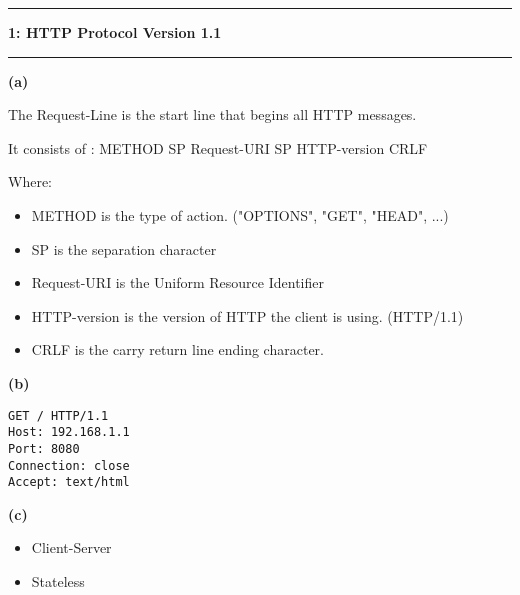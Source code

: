 \documentclass[11pt]{article}
\newcommand\question[2]{\vspace{.25in}\hrule\textbf{#1: #2}\vspace{.5em}\hrule\vspace{.10in}}
\renewcommand\part[1]{\vspace{.10in}\textbf{(#1)}}
\begin{document}
\raggedright

\newcommand\NAME{Lukas, Young, Vincent}  %

\question{1}{HTTP Protocol Version 1.1}

\part{a}

The Request-Line is the start line that begins all HTTP messages.

It consists of : METHOD SP Request-URI SP HTTP-version CRLF

Where:

\begin{itemize}

	\item METHOD is the type of action. ("OPTIONS", "GET", "HEAD", ...)

	\item SP is the separation character

	\item Request-URI is the Uniform Resource Identifier

	\item HTTP-version is the version of HTTP the client is using. (HTTP/1.1)

	\item CRLF is the carry return line ending character.
	
\end{itemize}

\part{b}

\begin{small}
\begin{lstlisting}[frame=single]
GET / HTTP/1.1
Host: 192.168.1.1
Port: 8080
Connection: close
Accept: text/html
\end{lstlisting}
\end{small}

\part{c}

\begin{itemize}

	\item Client-Server

	\item Stateless
	
\end{itemize}
\end{document}
